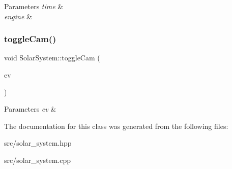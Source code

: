 \begin{DoxyParams}{Parameters}
{\em time} & \\
\hline
{\em engine} & \\
\hline
\end{DoxyParams}
\mbox{\label{classSolarSystem_a8259d4214fecd930b539c0a4718dec05}} 
\subsubsection{\texorpdfstring{toggleCam()}{toggleCam()}}
{\footnotesize\ttfamily void Solar\+System\+::toggle\+Cam (\begin{DoxyParamCaption}\item[{S\+D\+L\+\_\+\+Event \&}]{ev }\end{DoxyParamCaption})}


\begin{DoxyParams}{Parameters}
{\em ev} & \\
\hline
\end{DoxyParams}


The documentation for this class was generated from the following files\+:\begin{DoxyCompactItemize}
\item 
src/solar\+\_\+system.\+hpp\item 
src/solar\+\_\+system.\+cpp\end{DoxyCompactItemize}
